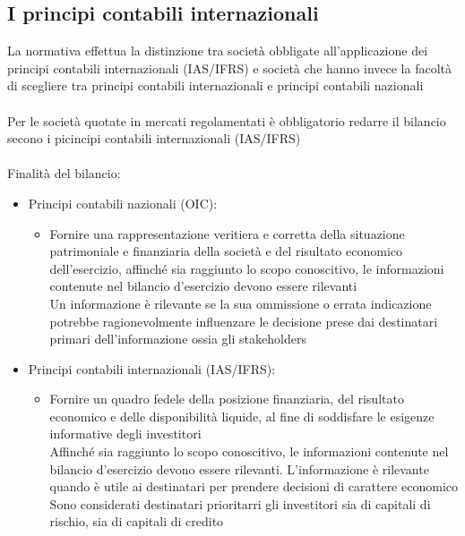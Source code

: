 \documentclass{report}
\begin{document}
\subsection{I principi contabili internazionali} %
\label{sub:I principi contabili internazionali}
La normativa effettua la distinzione tra società obbligate all'applicazione dei principi contabili internazionali (IAS/IFRS) e società che hanno invece la facoltà di scegliere tra principi contabili internazionali e principi contabili nazionali
\\
\\
Per le società quotate in mercati regolamentati è obbligatorio redarre il bilancio secono i picincipi contabili internazionali (IAS/IFRS)
\\
\\
Finalità del bilancio:
\\
\begin{itemize}
  \item{Principi contabili nazionali (OIC): \\
    \begin{itemize}
      \item{Fornire una rappresentazione veritiera e corretta della situazione patrimoniale e finanziaria della società e del risultato economico dell'esercizio, affinché sia raggiunto lo scopo conoscitivo, le informazioni contenute nel bilancio d'esercizio devono essere rilevanti
        \\
        Un informazione è rilevante se la sua ommissione o errata indicazione potrebbe ragionevolmente influenzare le decisione prese dai destinatari primari dell'informazione ossia gli stakeholders}
    \end{itemize}
    }
  \item{Principi contabili internazionali (IAS/IFRS): \\
    \begin{itemize}
      \item{Fornire un quadro fedele della posizione finanziaria, del risultato economico e delle disponibilità liquide, al fine di soddisfare le esigenze informative degli investitori
        \\
        Affinché sia raggiunto lo scopo conoscitivo, le informazioni contenute nel bilancio d'esercizio devono essere rilevanti. L'informazione è rilevante quando è utile ai destinatari per prendere decisioni di carattere economico 
        \\
        Sono considerati destinatari prioritarri gli investitori sia di capitali di rischio, sia di capitali di credito}
    \end{itemize}
    }
\end{itemize}
\end{document}
